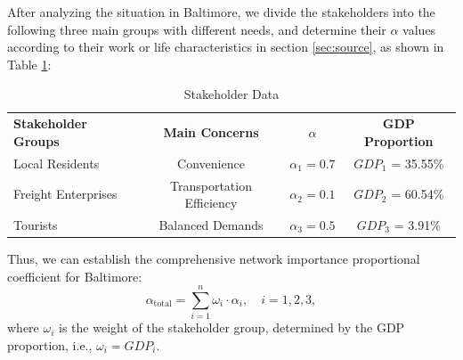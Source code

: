 \documentclass{mcmthesis}
\begin{document}
After analyzing the situation in Baltimore, we divide the stakeholders into the following three main groups with different needs, and determine their \(\alpha\) values according to their work or life characteristics in section \ref{sec:source}, as shown in Table \ref{tab:stakeholder_data}:


\begin{table}[H]
  \centering
  \caption{Stakeholder Data}
  \label{tab:stakeholder_data}
  \begin{tabular}{@{}lccc@{}}
  \rowcolor[HTML]{C0C0C0} 
  \textbf{Stakeholder Groups} & \textbf{Main Concerns}    & \textbf{$\alpha$} & \textbf{GDP Proportion} \\
  \rowcolor[HTML]{FFFC9E} 
  Local Residents             & Convenience               & $\alpha_1 = 0.7$                   & \(GDP_1\) = 35.55\%                      \\
  \rowcolor[HTML]{96FFFB} 
  Freight Enterprises         & Transportation Efficiency & $\alpha_2 = 0.1$                   & \(GDP_2\) = 60.54\%                      \\
  \rowcolor[HTML]{9AFF99} 
  Tourists                    & Balanced Demands          & $\alpha_3 = 0.5$                   & \(GDP_3\) = 3.91\%                      
  \end{tabular}
\end{table}

Thus, we can establish the comprehensive network importance proportional coefficient for Baltimore:
\begin{equation}
  \alpha_{\text{total}}=\sum_{i = 1}^{n}\omega_i\cdot\alpha_i,\quad i = 1,2,3,
\end{equation}
where \(\omega_i\) is the weight of the stakeholder group, determined by the GDP proportion, i.e., \(\omega_i = GDP_i\).
\end{document}
